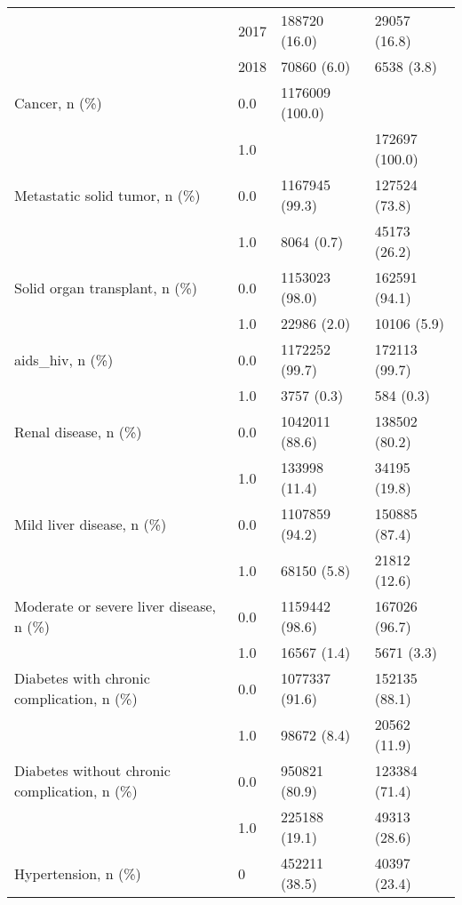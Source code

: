 \begin{tabular}{llll}
                                       & 2017 &      188720 (16.0) &       29057 (16.8) \\
                                       & 2018 &        70860 (6.0) &         6538 (3.8) \\
Cancer, n (\%) & 0.0 &    1176009 (100.0) &                    \\
                                       & 1.0 &                    &     172697 (100.0) \\
Metastatic solid tumor, n (\%) & 0.0 &     1167945 (99.3) &      127524 (73.8) \\
                                       & 1.0 &         8064 (0.7) &       45173 (26.2) \\
Solid organ transplant, n (\%) & 0.0 &     1153023 (98.0) &      162591 (94.1) \\
                                       & 1.0 &        22986 (2.0) &        10106 (5.9) \\
aids\_hiv, n (\%) & 0.0 &     1172252 (99.7) &      172113 (99.7) \\
                                       & 1.0 &         3757 (0.3) &          584 (0.3) \\
Renal disease, n (\%) & 0.0 &     1042011 (88.6) &      138502 (80.2) \\
                                       & 1.0 &      133998 (11.4) &       34195 (19.8) \\
Mild liver disease, n (\%) & 0.0 &     1107859 (94.2) &      150885 (87.4) \\
                                       & 1.0 &        68150 (5.8) &       21812 (12.6) \\
Moderate or severe liver disease, n (\%) & 0.0 &     1159442 (98.6) &      167026 (96.7) \\
                                       & 1.0 &        16567 (1.4) &         5671 (3.3) \\
Diabetes with chronic complication, n (\%) & 0.0 &     1077337 (91.6) &      152135 (88.1) \\
                                       & 1.0 &        98672 (8.4) &       20562 (11.9) \\
Diabetes without chronic complication, n (\%) & 0.0 &      950821 (80.9) &      123384 (71.4) \\
                                       & 1.0 &      225188 (19.1) &       49313 (28.6) \\
Hypertension, n (\%) & 0 &      452211 (38.5) &       40397 (23.4) \\

\end{tabular}

